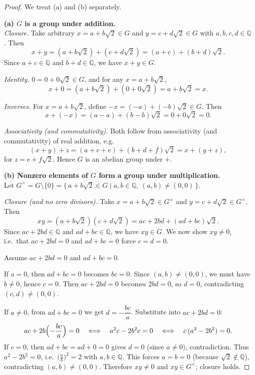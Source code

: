 \documentclass[12pt]{article}
\theoremstyle{definition}
\begin{document}
\begin{proof}
We treat (a) and (b) separately.

\dotfill

\noindent\textbf{(a) $G$ is a group under addition.}\\

\noindent
\emph{Closure.}
Take arbitrary $x=a+b\sqrt2\in G$ and $y=c+d\sqrt2\in G$ with $a,b,c,d\in\mathbb{Q}$.
Then
\[
x+y=(a+b\sqrt2)+(c+d\sqrt2)=(a+c)+(b+d)\sqrt2.
\]
Since $a+c\in\mathbb{Q}$ and $b+d\in\mathbb{Q}$, we have $x+y\in G$.

\noindent
\emph{Identity.}
$0=0+0\sqrt2\in G$, and for any $x=a+b\sqrt2$,
\[
x+0=(a+b\sqrt2)+(0+0\sqrt2)=a+b\sqrt2=x.
\]

\noindent
\emph{Inverses.}
For $x=a+b\sqrt2$, define $-x=(-a)+(-b)\sqrt2\in G$. Then
\[
x+(-x)=(a-a)+(b-b)\sqrt2=0+0\sqrt2=0.
\]

\noindent
\emph{Associativity (and commutativity).}
Both follow from associativity (and commutativity) of real addition, e.g.
\[
(x+y)+z=(a+c+e)+(b+d+f)\sqrt2=x+(y+z),
\]
for $z=e+f\sqrt2$. Hence $G$ is an abelian group under $+$.

\dotfill

\noindent\textbf{(b) Nonzero elements of $G$ form a group under multiplication.}\\

\noindent
Let $G^\times=G\setminus\{0\}=\{\,a+b\sqrt2\in G\mid a,b\in\mathbb{Q},\ (a,b)\neq(0,0)\,\}$.

\noindent
\emph{Closure (and no zero divisors).}
Take $x=a+b\sqrt2\in G^\times$ and $y=c+d\sqrt2\in G^\times$.
Then
\[
xy=(a+b\sqrt2)(c+d\sqrt2)=ac+2bd+(ad+bc)\sqrt2.
\]
Since $ac+2bd\in\mathbb{Q}$ and $ad+bc\in\mathbb{Q}$, we have $xy\in G$.
We now show $xy\neq 0$, i.e.\ that $ac+2bd=0$ and $ad+bc=0$ force $c=d=0$.

Assume $ac+2bd=0$ and $ad+bc=0$.

If $a=0$, then $ad+bc=0$ becomes $bc=0$. Since $(a,b)\neq(0,0)$, we must have $b\neq 0$, hence $c=0$.
Then $ac+2bd=0$ becomes $2bd=0$, so $d=0$, contradicting $(c,d)\neq(0,0)$.

If $a\neq 0$, from $ad+bc=0$ we get $d=-\dfrac{bc}{a}$. Substitute into $ac+2bd=0$:
\[
ac+2b\Bigl(-\frac{bc}{a}\Bigr)=0 \quad\Longleftrightarrow\quad a^2c-2b^2c=0
\quad\Longleftrightarrow\quad c\,(a^2-2b^2)=0.
\]
If $c=0$, then $ad+bc=ad+0=0$ gives $d=0$ (since $a\neq 0$), contradiction.
Thus $a^2-2b^2=0$, i.e.\ $\bigl(\tfrac{a}{b}\bigr)^2=2$ with $a,b\in\mathbb{Q}$. This forces $a=b=0$
(because $\sqrt2\notin\mathbb{Q}$), contradicting $(a,b)\neq(0,0)$. Therefore $xy\neq 0$ and
$xy\in G^\times$; closure holds.


\end{proof}
\end{document}

